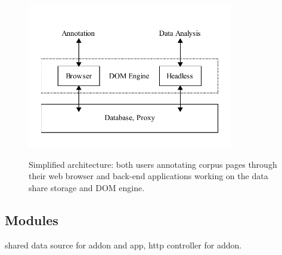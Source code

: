\begin{figure}
	{\includegraphics[width=0.8\textwidth]{arch}}
\caption{\label{f:arch}Simplified \KrdWrd architecture: both users annotating corpus pages through their web browser
and back-end applications working on the data share storage and DOM engine.}
\end{figure}


\subsection{Modules}

shared data source for addon and app, http controller for addon.
